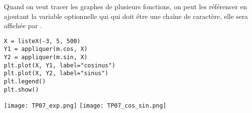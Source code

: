 Quand on veut tracer les graphes de plusieurs fonctions, on peut les référencer en ajoutant la variable optionnelle  qui qui doit être une chaîne de caractère, elle sera affichée par .
\begin{lstlisting}
X = listeX(-3, 5, 500)
Y1 = appliquer(m.cos, X)
Y2 = appliquer(m.sin, X)
plt.plot(X, Y1, label="cosinus")
plt.plot(X, Y2, label="sinus")
plt.legend()
plt.show()
\end{lstlisting}
\begin{center}
\texttt{[image: TP07\_exp.png]}
\hfill
\texttt{[image: TP07\_cos\_sin.png]} 
\end{center}
